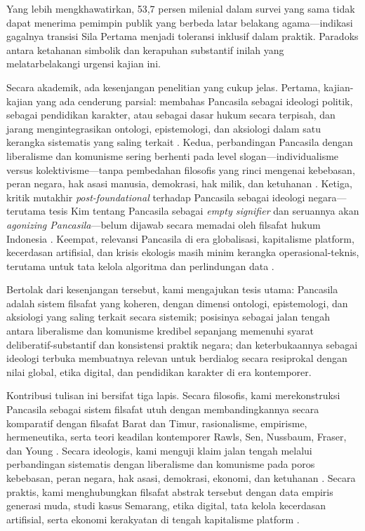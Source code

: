 \documentclass[journal]{IEEEtran}
\begin{document}
Yang lebih mengkhawatirkan, 53,7 persen milenial dalam survei yang sama tidak dapat menerima pemimpin publik yang berbeda latar belakang agama---indikasi gagalnya transisi Sila Pertama menjadi toleransi inklusif dalam praktik. Paradoks antara ketahanan simbolik dan kerapuhan substantif inilah yang melatarbelakangi urgensi kajian ini.

Secara akademik, ada kesenjangan penelitian yang cukup jelas. Pertama, kajian-kajian yang ada cenderung parsial: membahas Pancasila sebagai ideologi politik, sebagai pendidikan karakter, atau sebagai dasar hukum secara terpisah, dan jarang mengintegrasikan ontologi, epistemologi, dan aksiologi dalam satu kerangka sistematis yang saling terkait \cite{pristiwiyanto2021,notonagoro1975}. Kedua, perbandingan Pancasila dengan liberalisme dan komunisme sering berhenti pada level slogan---individualisme versus kolektivisme---tanpa pembedahan filosofis yang rinci mengenai kebebasan, peran negara, hak asasi manusia, demokrasi, hak milik, dan ketuhanan \cite{madung2016,duha2022,ulumhamida2018}. Ketiga, kritik mutakhir \textit{post-foundational} terhadap Pancasila sebagai ideologi negara---terutama tesis Kim tentang Pancasila sebagai \textit{empty signifier} dan seruannya akan \textit{agonizing Pancasila}---belum dijawab secara memadai oleh filsafat hukum Indonesia \cite{kim2024,mouffe2005,laclau2001}. Keempat, relevansi Pancasila di era globalisasi, kapitalisme platform, kecerdasan artifisial, dan krisis ekologis masih minim kerangka operasional-teknis, terutama untuk tata kelola algoritma dan perlindungan data \cite{kurniasih2016,rahmatullah2022,kamalashif2023,suntana2023}.

Bertolak dari kesenjangan tersebut, kami mengajukan tesis utama: Pancasila adalah sistem filsafat yang koheren, dengan dimensi ontologi, epistemologi, dan aksiologi yang saling terkait secara sistemik; posisinya sebagai jalan tengah antara liberalisme dan komunisme kredibel sepanjang memenuhi syarat deliberatif-substantif dan konsistensi praktik negara; dan keterbukaannya sebagai ideologi terbuka membuatnya relevan untuk berdialog secara resiprokal dengan nilai global, etika digital, dan pendidikan karakter di era kontemporer.

Kontribusi tulisan ini bersifat tiga lapis. Secara filosofis, kami merekonstruksi Pancasila sebagai sistem filsafat utuh dengan membandingkannya secara komparatif dengan filsafat Barat dan Timur, rasionalisme, empirisme, hermeneutika, serta teori keadilan kontemporer Rawls, Sen, Nussbaum, Fraser, dan Young \cite{rawls1971,sen1999,nussbaum2011,fraser2008,young1990}. Secara ideologis, kami menguji klaim jalan tengah melalui perbandingan sistematis dengan liberalisme dan komunisme pada poros kebebasan, peran negara, hak asasi, demokrasi, ekonomi, dan ketuhanan \cite{madung2016,duha2022,berlin1969,locke1988,mill1978}. Secara praktis, kami menghubungkan filsafat abstrak tersebut dengan data empiris generasi muda, studi kasus Semarang, etika digital, tata kelola kecerdasan artifisial, serta ekonomi kerakyatan di tengah kapitalisme platform \cite{csis2023,kompas2023,wibowo2021,kominfo2023,uupdp2022}.
\end{document}
